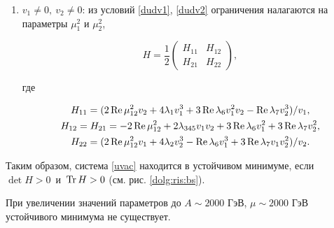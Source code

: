 \begin{enumerate}



\item[3)] $v_1 \ne 0, \ v_2 \ne 0$: из условий \eqref{dudv1}, \eqref{dudv2} ограничения налагаются на параметры $\mu_1^2$ и $ \mu_{2}^2$,

              \begin{equation}

            H = \frac{1}{2} \displaystyle \left(\begin{array}{cc}

            \displaystyle H_{11} &

            \displaystyle H_{12}  \\

            \displaystyle  H_{21}&

            \displaystyle H_{22} \end{array}\right),

        \end{equation}

где

\begin{gather}

H_{11}=(2\mathop{\rm Re} \mu_{12}^2 v_2+4 \lambda_1 v_1^3 +3\mathop{\rm Re} \lambda_6 v_1^2 v_2 -\mathop{\rm Re} \lambda_7 v_2^3)/v_1,\\

H_{12}=H_{21}=-2\mathop{\rm Re} \mu_{12}^2+2 \lambda_{345} v_1 v_2+3\mathop{\rm Re} \lambda_6 v_1^2+3\mathop{\rm Re} \lambda_7 v_2^2,\\

H_{22}=(2\mathop{\rm Re} \mu_{12}^2 v_1+4 \lambda_2 v_2^3 -\mathop{\rm Re} \lambda_6 v_1^3+3\mathop{\rm Re} \lambda_7 v_1 v_2^2)/v_2.

\end{gather}

\end{enumerate}





Таким образом, система \eqref{uvac} находится в устойчивом минимуме, если \linebreak \mbox{$\det H>0$ и $\mathop{\rm Tr} H>0$}  (см. рис. \ref{dolg:ris:bs}).







При увеличении значений параметров до $A \sim 2000$ ГэВ, $\mu \sim 2000$ ГэВ устойчивого минимума не существует.



